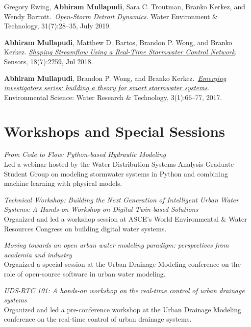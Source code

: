 \documentclass[a4paper,11pt]{article}
\newcommand{\years}[1]{%
  {\reversemarginpar\strut\marginnote{{\small#1}}}%
}
\begin{document}
\years{2019} Gregory Ewing, \textbf{Abhiram Mullapudi}, Sara C. Troutman, Branko Kerkez, and Wendy Barrott.\ \emph{Open-Storm Detroit Dynamics}. Water Environment \& Technology, 31(7):28--35, July 2019.\\[.1cm]


\years{2018} \textbf{Abhiram Mullapudi}, Matthew D. Bartos, Brandon P. Wong, and Branko Kerkez.
\href{https://randomstorms.net/data/papers/shapingwater.pdf}{\emph{Shaping Streamflow Using a Real-Time Stormwater Control Network}}. Sensors, 18(7):2259, Jul 2018.\\[.1cm]


\years{2017} \textbf{Abhiram Mullapudi}, Brandon P. Wong, and Branko Kerkez.\ \href{https://randomstorms.net/data/papers/stormwatertheory.pdf}{\emph{Emerging investigators series: building a theory for smart stormwater systems}}. Environmental Science: Water Research \& Technology, 3(1):66–77, 2017.

\section*{Workshops and Special Sessions}
\years{2024} \emph{From Code to Flow: Python-based Hydraulic Modeling}\\[0.2cm]
Led a webinar hosted by the Water Distribution Systems Analysis Graduate Student Group on modeling stormwater systems in Python and combining machine learning with physical models.\\[.1cm]

\years{2023} \emph{Technical Workshop: Building the Next Generation of Intelligent Urban Water
Systems: A Hands-on Workshop on Digital Twin-based Solutions}\\[0.2cm]
Organized and led a workshop session at ASCE's World Environmental \& Water Resources Congress on building
digital water systems.\\[.1cm]

\years{2022} \emph{Moving towards an open urban water modeling paradigm: perspectives from academia and industry}\\[.2cm]
Organized a special session at the Urban Drainage Modeling conference on the
role of open-source software in urban water modeling.\\[.1cm]

\years{2022} \emph{UDS-RTC 101: A hands-on workshop on the real-time control of urban drainage systems}\\[.2cm]
Organized and led a pre-conference workshop at the Urban Drainage Modeling
conference on the real-time control of urban drainage systems.\\[.1cm]
\end{document}
